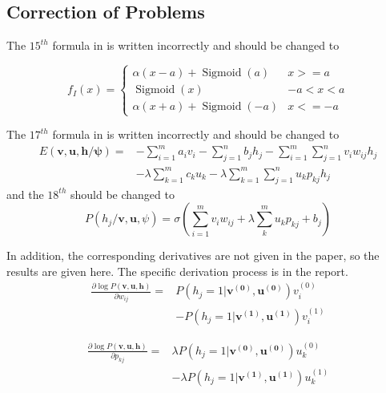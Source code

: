 \documentclass{bioinfo}
\begin{document}
\subsection{Correction of Problems}
The $15^{th}$ formula in \cite{YiThe} is written incorrectly and should be changed to

\begin{equation}
\nonumber
f_{I}(x)=\left\{\begin{array}{ll}{\alpha(x-a)+\operatorname{Sigmoid}(a)} & {x>=a} \\ {\operatorname{Sigmoid}(x)} & {-a<x<a} \\ {\alpha(x+a)+\operatorname{Sigmoid}(-a)} & {x<=-a}\end{array}\right.
\end{equation}

The $17^{th}$ formula in \cite{wang2017improved} is written incorrectly and should be changed to
\begin{equation}
\nonumber
\begin{aligned} E(\boldsymbol{v}, \boldsymbol{u}, \boldsymbol{h} / \boldsymbol{\psi})=&-\sum_{i=1}^{m} a_{i} v_{i}-\sum_{j=1}^{n} b_{j} h_{j}-\sum_{i=1}^{m} \sum_{j=1}^{n} v_{i} w_{i j} h_{j} \\ &-\lambda \sum_{k=1}^{m} c_{k} u_{k}-\lambda \sum_{k=1}^{m} \sum_{j=1}^{n} u_{k} p_{k j} h_{j} \end{aligned}
\end{equation}
and the $18^{th}$ should be changed to
\begin{equation}
\nonumber
P\left(h_{j} / \boldsymbol{v}, \boldsymbol{u}, \psi\right)=\sigma\left(\sum_{i=1}^{m} v_{i} w_{i j}+\lambda \sum_{k}^{m} u_{k}p_{kj}+b_{j}\right)
\end{equation}

In addition, the corresponding derivatives are not given in the paper, so the results are given here. The specific derivation process is in the report.
\begin{equation}
\begin{aligned} 
\frac{\partial \log P(\boldsymbol{v}, \boldsymbol{u}, \boldsymbol{h})}{\partial w_{ij}}=&P(h_j=1|\boldsymbol{v^{(0)}},\boldsymbol{u^{(0)}})v_i^{(0)}\\&-P(h_j=1|\boldsymbol{v^{(1)}},\boldsymbol{u^{(1)}})v_i^{(1)}
\end{aligned}
\end{equation}

\begin{equation}
\begin{aligned} 
\frac{\partial \log P(\boldsymbol{v}, \boldsymbol{u}, \boldsymbol{h})}{\partial p_{kj}}=&\lambda P(h_j=1|\boldsymbol{v^{(0)}},\boldsymbol{u^{(0)}})u_k^{(0)}\\&-\lambda P(h_j=1|\boldsymbol{v^{(1)}},\boldsymbol{u^{(1)}})u_k^{(1)}
\end{aligned}
\end{equation}
\end{document}
